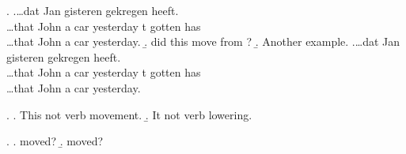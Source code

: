 \documentclass{article}
\begin{document}
\ex. 
\arrowgloss\ag.\ldots dat Jan  gisteren   gekregen heeft.\\
\ldots that John {a \hspace*{1em} car}  yesterday t gotten has \\
\ldots that John a car yesterday.
\addtolength{\extraexheight}{1ex}
\b.   did this move from ?
\b. Another example.
\bg.\ldots dat Jan  gisteren   gekregen heeft.\\
\ldots that John {a \hspace*{1em} car}  yesterday t gotten has \\
\ldots that John a car yesterday.

\ex.
\a. This  not  verb movement.
\b. It   not  verb lowering.

\ex.
\arrowstrut
\a.   
moved?  
\b.   
moved?  
\end{document}
